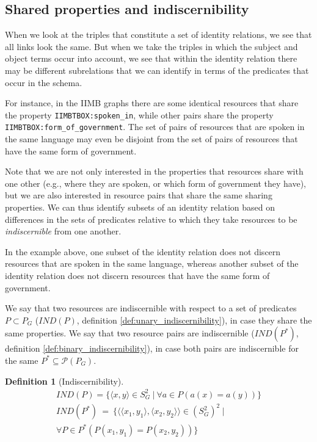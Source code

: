 \documentclass[letterpaper]{article}
\newtheorem{definition}{Definition}
\begin{document}
\subsection{Shared properties and indiscernibility}
\label{sec:indiscernibility}

When we look at the triples that constitute a set of identity relations,
  we see that all links look the same.
But when we take the triples in which the subject and object terms occur
  into account, we see that within the identity relation there may be
  different subrelations that we can identify in terms of the predicates
  that occur in the schema.

For instance, in the IIMB graphs there are some identical resources that
  share the property \verb|IIMBTBOX:spoken_in|, while other pairs share
  the property \verb|IIMBTBOX:form_of_government|.
The set of pairs of resources that are spoken in the same language may even
  be disjoint from the set of pairs of resources that have the same
  form of government.

Note that we are not only interested in the properties that resources share
  with one other (e.g., where they are spoken, or which form of government
  they have), but we are also interested in resource pairs that share
  the same sharing properties.
We can thus identify subsets of an identity relation based on differences
  in the sets of predicates relative to which they take resources to be
  \emph{indiscernible} from one another.

In the example above, one subset of the identity relation does not discern
  resources that are spoken in the same language, whereas another subset
  of the identity relation does not discern resources that have the same
  form of government.

We say that two resources are indiscernible with respect to
  a set of predicates $P \subset P_G$ ($IND(P)$,
  definition \ref{def:unary_indiscernibility}),
  in case they share the same properties.
We say that two resource pairs are indiscernible ($IND(P^*)$,
  definition \ref{def:binary_indiscernibility}),
  in case both pairs are indiscernible for the same
  $P^* \subseteq \mathcal{P}(P_G)$.

\begin{definition}[Indiscernibility]
\begin{align}
IND(P) = \{
  \langle x, y \rangle \in S_G^2
\  \vert \ 
  \forall a \in P(a(x) = a(y))
\}
\label{def:unary_indiscernibility}
\\
IND(P^*) \  = \  \{
    \langle
      \langle x_1, y_1 \rangle,
      \langle x_2, y_2 \rangle
    \rangle \in (S_G^2)^2
  \  \vert \ 
\nonumber
\\
    \forall P \in P^*(P(x_1, y_1) = P(x_2, y_2))
  \}
\label{def:binary_indiscernibility}
\end{align}
\end{definition}
\end{document}
